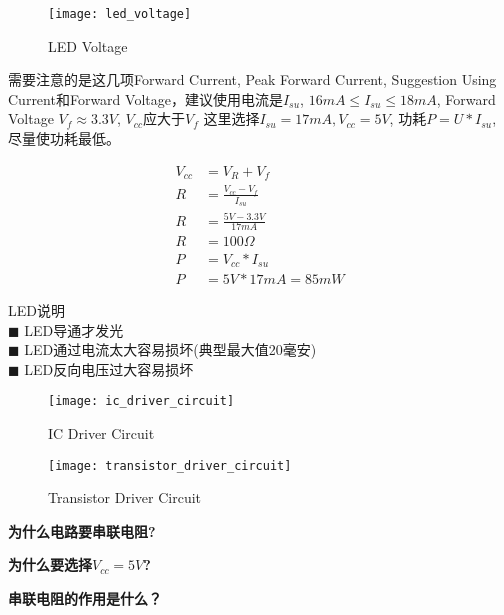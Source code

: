 \begin{figure}[H]
    \centering
    \texttt{[image: led\_voltage]}
    \caption{LED Voltage}
    \label{fig:led_voltage}
\end{figure}

需要注意的是这几项Forward Current, Peak Forward Current, Suggestion Using Current和Forward Voltage，建议使用电流是$I_{su}$, $16mA \leq I_{su} \leq 18mA$, Forward Voltage $V_f \approx 3.3V$, $V_{cc}$应大于$V_f$ 这里选择$I_{su}=17mA, V_{cc}=5V$, 功耗$P=U*I_{su}$, 尽量使功耗最低。

\begin{equation}\label{eq:led_calc_r}
\begin{aligned}
        V_{cc} & = V_R + V_f \\
        R & = \frac{V_{cc} - V_f}{I_{su}} \\
        R & = \frac{5V - 3.3V}{17mA} \\
        R & = 100\Omega \\
        P & = V_{cc} * I_{su} \\
        P & = 5V * 17mA = 85mW
\end{aligned}
\end{equation}

LED说明 \\
\indent $\blacksquare$ LED导通才发光 \\
\indent $\blacksquare$ LED通过电流太大容易损坏(典型最大值20毫安) \\
\indent $\blacksquare$ LED反向电压过大容易损坏 \\


\begin{figure}[H]
    \centering
    \texttt{[image: ic\_driver\_circuit]}
    \caption{IC Driver Circuit}
    \label{fig:ic_driver_circuit}
\end{figure}

\begin{figure}[H]
    \centering
    \texttt{[image: transistor\_driver\_circuit]}
    \caption{Transistor Driver Circuit}
    \label{fig:transistor_driver_circuit}
\end{figure}

\textbf{为什么电路要串联电阻?}

\textbf{为什么要选择$V_{cc}=5V$?}

\textbf{串联电阻的作用是什么？}
